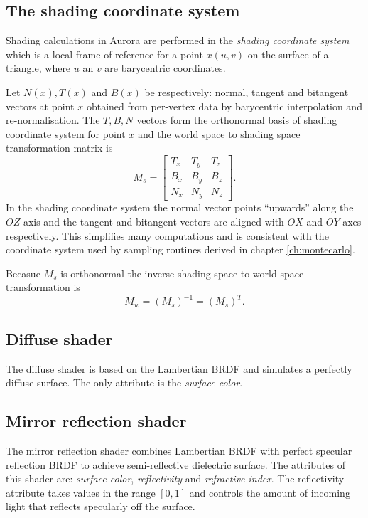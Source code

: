 \subsection{The shading coordinate system}
Shading calculations in Aurora are performed in the \emph{shading coordinate system} which is a local frame of reference for a point $x(u,v)$ on the surface of a triangle, where $u$ an $v$ are barycentric coordinates.

Let $N(x), T(x)$ and $B(x)$ be respectively: normal, tangent and bitangent vectors at point $x$ obtained from per-vertex data by barycentric interpolation and re-normalisation. The $T, B, N$ vectors form the orthonormal basis of shading coordinate system for point $x$ and the world space to shading space transformation matrix is
\begin{equation}
  M_{s} = \left[
    \begin{array}{ccc}
      T_{x} & T_{y} & T_{z} \\
      B_{x} & B_{y} & B_{z} \\
      N_{x} & N_{y} & N_{z}
    \end{array}
  \right].
\end{equation}
In the shading coordinate system the normal vector points ``upwards'' along the $OZ$ axis and the tangent and bitangent vectors are aligned with $OX$ and $OY$ axes respectively. This simplifies many computations and is consistent with the coordinate system used by sampling routines derived in chapter \ref{ch:montecarlo}.

Becasue $M_{s}$ is orthonormal the inverse shading space to world space transformation is
\begin{equation}
  M_{w} = (M_{s})^{-1} = (M_{s})^{T}.
\end{equation}

\subsection{Diffuse shader}
The diffuse shader is based on the Lambertian BRDF and simulates a perfectly diffuse surface. The only attribute is the \emph{surface color}.

\subsection{Mirror reflection shader}
The mirror reflection shader combines Lambertian BRDF with perfect specular reflection BRDF to achieve semi-reflective dielectric surface. The attributes of this shader are: \emph{surface color}, \emph{reflectivity} and \emph{refractive index}. The reflectivity attribute takes values in the range $[0,1]$ and controls the amount of incoming light that reflects specularly off the surface.

